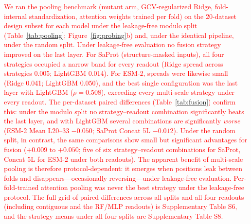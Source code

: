 \documentclass[numbered,webpdf,modern,large]{oup-authoring-template}
\newcommand{\rev}[1]{\textcolor{red}{#1}}
\begin{document}
\rev{We ran the pooling benchmark (mutant arm, GCV-regularized Ridge,
fold-internal standardization, attention weights trained per fold) on the
20-dataset design subset for each model under the leakage-free modulo split
(Table~\ref{tab:pooling}; Figure~\ref{fig:probing}b) and, under the identical
pipeline, under the random split. Under leakage-free evaluation no fusion
strategy improved on the last layer. For SaProt (structure-masked inputs),
all four strategies occupied a narrow band for every readout (Ridge spread
across strategies 0.005; LightGBM 0.014). For ESM-2, spreads were likewise
small (Ridge 0.041; LightGBM 0.050), and the best single configuration was
the last layer with LightGBM ($\rho = 0.508$), exceeding every multi-scale
strategy under every readout. The per-dataset paired differences
(Table~\ref{tab:fusion}) confirm this: under the modulo split no
strategy--readout combination significantly beats the last layer, and with
LightGBM several combinations are significantly \emph{worse} (ESM-2 Mean
L20--33 $-0.050$; SaProt Concat 5L $-0.012$). Under the random split,
in contrast, the same comparisons show small but significant advantages for
fusion ($+0.009$ to $+0.050$; five of six strategy--readout combinations for
SaProt, Concat 5L for ESM-2 under both readouts). The apparent benefit of
multi-scale pooling is therefore protocol-dependent: it emerges when
positions leak between folds and disappears---occasionally reversing---under
leakage-free evaluation. Per-fold-trained attention pooling was never the
best strategy under the leakage-free protocol. The full grid of
paired differences across all splits and all four readouts (including
contiguous and the RF/MLP readouts) is Supplementary Table S6, and the
strategy means under all four splits are Supplementary Table S8.}
\end{document}
